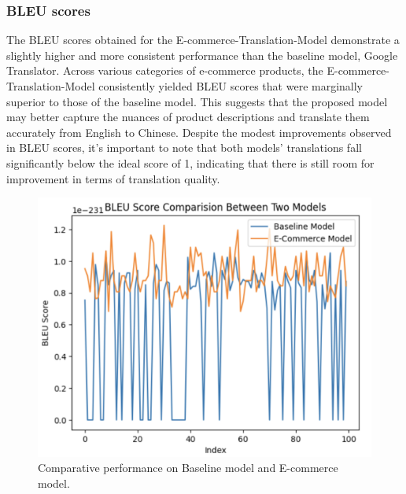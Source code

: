 \documentclass[sigconf]{acmart}
\begin{document}
\subsubsection{BLEU scores}
The BLEU scores obtained for the E-commerce-Translation-Model demonstrate a slightly higher and more consistent performance than the baseline model, Google Translator. Across various categories of e-commerce products, the E-commerce-Translation-Model consistently yielded BLEU scores that were marginally superior to those of the baseline model. This suggests that the proposed model may better capture the nuances of product descriptions and translate them accurately from English to Chinese. Despite the modest improvements observed in BLEU scores\cite{mathur_baldwin_cohn_2020}, it's important to note that both models' translations fall significantly below the ideal score of 1, indicating that there is still room for improvement in terms of translation quality.
\begin{figure}[t]
\centering
\captionsetup{justification=centering}
\includegraphics[width=1.05\columnwidth]{Reports/Evaluation/Report/Evaluation/Images/res.png}
\caption{Comparative performance on Baseline model and E-commerce model.}
\end{figure}
\end{document}
